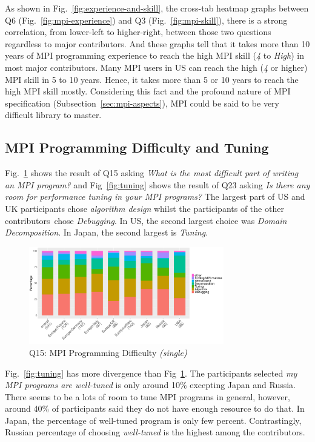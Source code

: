 \documentclass[preprint,5p,times]{elsarticle}
\def\myquote#1{{\it #1}}
\def\countries{contributors}%
\def\mcountries{major contributors\xspace{}}%
\begin{document}
As shown in Fig.~\ref{fig:experience-and-skill}, the cross-tab heatmap
graphs between Q6 (Fig.~\ref{fig:mpi-experience}) and Q3
(Fig.~\ref{fig:mpi-skill}), there is a strong correlation, from
lower-left to higher-right, between those
two questions regardless to \mcountries. And these graphs
tell that it takes more than 10 years of MPI programming experience to
reach the high MPI skill (\myquote{4} to \myquote{High}) in most
\mcountries. Many MPI users in US can reach the high
(\myquote{4} or higher) MPI skill in 5 to 10 years. Hence, it takes
more than 5 or 10 years to reach the high MPI skill
mostly. Considering this fact
and the profound nature of MPI specification
(Subsection~\ref{sec:mpi-aspects}), MPI could be said to be very
difficult library to master.

\subsection{MPI Programming Difficulty and Tuning}

Fig.~\ref{fig:difficulty} shows the result of Q15 asking \myquote{What is the
most difficult part of writing an MPI program?} and
Fig~\ref{fig:tuning} shows the result of Q23 asking \myquote{Is there any
room for performance tuning in your MPI programs?} The largest part
of US and UK participants chose \myquote{algorithm design} whilst the
participants of the other \countries\  chose
\myquote{Debugging}. In US, the second largest choice was
\myquote{Domain Decomposition}. In Japan, the second largest is
\myquote{Tuning}.

\begin{figure}[htb]
\begin{center}
\includegraphics[width=8.5cm]{R-scripts/Q15.pdf}
\caption{Q15: MPI Programming Difficulty {\it(single)}}
\label{fig:difficulty}
\end{center}
\end{figure}

Fig.~\ref{fig:tuning} has more divergence than
Fig~\ref{fig:difficulty}. The participants selected \myquote{my MPI
  programs are well-tuned} is only around 10\% excepting Japan and
Russia. There seems to be a lots of room to tune MPI programs in
general, however, around 40\% of participants said they do not have
enough resource to do that. In Japan, the percentage of well-tuned
program is only few percent. Contrastingly, Russian percentage of
choosing \myquote{well-tuned} is the highest among the \countries.
\end{document}
